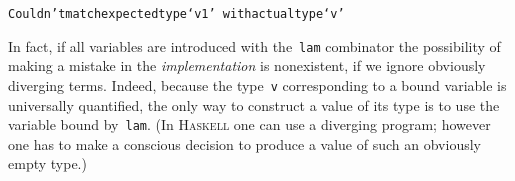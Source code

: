 \documentclass[9pt,authoryear]{sigplanconf}
\begin{document}
{{}\vphantom{$\{$}}\texttt{\makebox[1.22ex][c]{-}\makebox[1.22ex][c]{-}\mbox{\hspace{0.50em}}Couldn{'}t\mbox{\hspace{0.50em}}match\mbox{\hspace{0.50em}}expected\mbox{\hspace{0.50em}}type\mbox{\hspace{0.50em}}{`}v1{'}}\texttt{{\nopagebreak \newline%
}\vphantom{$\{$}}\texttt{\makebox[1.22ex][c]{-}\makebox[1.22ex][c]{-}\mbox{\hspace{6.50em}}with\mbox{\hspace{0.50em}}actual\mbox{\hspace{0.50em}}type\mbox{\hspace{0.50em}}{`}v{'}}\texttt{{\nopagebreak \newline%
}\vphantom{$\{$}}%


%
%


%
In fact, if all variables are introduced with the{~}\texttt{lam} combinator
    the possibility of making a mistake in the \emph{implementation} is
    nonexistent, if we ignore obviously diverging terms. Indeed, because
    the type{~}\texttt{v} corresponding to a bound variable is universally
    quantified, the only way to construct a value of its type is to
    use the variable bound by{~}\texttt{lam}. (In \textsc{Haskell} one can use a
    diverging program; however one has to make a conscious decision to
    produce a value of such an obviously empty type.)%
\end{document}
